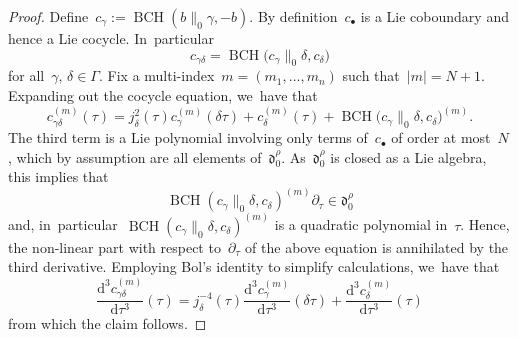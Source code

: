 \documentclass[10pt,a4paper]{article}
\numberwithin{equation}{section}
\let\oldbullet\bullet
\renewcommand{\bullet}{{\scriptscriptstyle\oldbullet}}
\theoremstyle{plain}
\theoremstyle{definition}
\newcommand{\tx}{\text}
\newcommand{\frakd}{\ensuremath{\mathfrak{d}}}
\newcommand{\rmd}{\ensuremath{\mathrm{d}}}
\let\Ga\Gamma
\let\ga\gamma
\DeclareMathOperator{\BCH}{BCH}
\newcommand{\dtau}{\rmd \tau}
\begin{document}
\begin{proof}
Define~$c_\ga:=\BCH(b\|_0\ga,-b)$. By definition~$c_\bullet$ is a Lie coboundary and hence a Lie cocycle. In~particular
\begin{equation*}c_{\ga\delta} = \BCH\bigl(c_\ga\big\|_0\delta,c_\delta\bigr)\end{equation*}
for all~$\ga,\,\delta\in\Ga$. Fix a multi-index~$m=(m_1,\ldots,m_n)$ such that~$|m|=N+1$.
Expanding out the cocycle equation, we~have that
\begin{equation*}c_{\ga\delta}^{(m)}(\tau) = j_\delta^2(\tau) c_\ga^{(m)}(\delta\tau) + c_\delta^{(m)}(\tau) + \BCH\bigl(c_\ga\big\|_0\delta,c_\delta\bigr)^{(m)}\tx{.}\end{equation*}
The third term is a Lie polynomial involving only terms of~$c_\bullet$ of order at most~$N$, which by assumption are all elements of~$\frakd_0^\rho$. As~$\frakd_0^\rho$ is closed as a Lie algebra, this implies that
\begin{equation*}\BCH(c_\ga\big\|_0\delta,c_\delta)^{(m)}\partial_\tau \in\frakd_0^\rho\end{equation*}
and, in~particular~$\BCH(c_\ga\big\|_0\delta,c_\delta)^{(m)}$ is a quadratic polynomial in~$\tau$. Hence, the non-linear part with respect to~$\partial_\tau$ of the above equation is annihilated by the third derivative. Employing Bol's identity to simplify calculations, we~have that
\begin{equation*}
\frac{\rmd^3 c_{\ga\delta}^{(m)}}{\dtau^3}(\tau)
=
j_\delta^{-4}(\tau)\frac{\rmd^3 c_{\ga}^{(m)}}{\dtau^3}(\delta\tau) + \frac{\rmd^3 c_{\delta}^{(m)}}{\dtau^3}(\tau)
\end{equation*}
from which the claim follows.
\end{proof}
\end{document}
